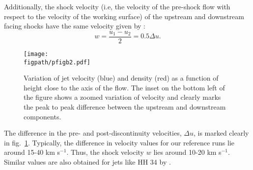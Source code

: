 \documentclass[useAMS,usenatbib]{mn2e}
\newcommand{\figpath}{../NEWFIGS}
\begin{document}
Additionally, the shock velocity (i.e, the velocity of the pre-shock
flow with respect to the velocity of the working surface) of the
upstream and downstream facing shocks have the same velocity given by \cite{Raga:1990p16416}:
\begin{equation}
w = \frac{u_1 - u_2}{2} = 0.5\Delta u.
\label{eq:shkvelws}
\end{equation}

\begin{figure}
\texttt{[image: \\figpath/pfigb2.pdf]}%
\caption{Variation of jet velocity (blue) and density (red) as a
  function of height close to the axis of the flow. The inset on the
  bottom left of the figure shows a zoomed variation of velocity and
  clearly marks the peak to peak difference between the upstream and
  downstream components.}
\label{fig:1dvelrho}
\end{figure}


The difference in the pre- and post-discontinuity velocities, $\Delta
u$, is marked clearly in fig.~\ref{fig:1dvelrho}. Typically, the
difference in velocity values for our reference runs lie around 15-40 km s$^{-1}$. Thus, the
shock velocity $w$ lies around 10-20 km s$^{-1}$. Similar values are
also obtained for jets like HH 34 by \cite{Raga:1992p16392}.







\label{lastpage}
\end{document}
